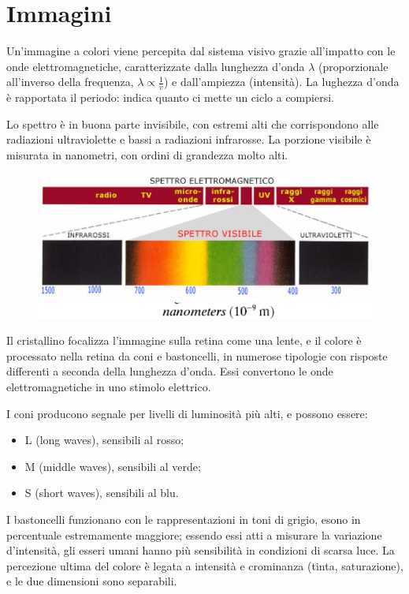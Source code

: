 \section{Immagini}
Un'immagine a colori viene percepita dal sistema visivo grazie all'impatto con le onde elettromagnetiche, caratterizzate dalla lunghezza d'onda $\lambda$ (proporzionale all'inverso della frequenza, $\lambda \propto \frac{1}{v}$) e dall'ampiezza (intensità). La lughezza d'onda è rapportata il periodo: indica quanto ci mette un ciclo a compiersi.

Lo spettro è in buona parte invisibile, con estremi alti che corrispondono alle radiazioni ultraviolette e bassi a radiazioni infrarosse. La porzione visibile è misurata in nanometri, con ordini di grandezza molto alti.

\begin{figure}[h]
	\centering
	\includegraphics[scale=0.6]{Lezioni/Immagini/arcobaleno}
\end{figure}

Il cristallino focalizza l'immagine sulla retina come una lente, e il colore è processato nella retina da coni e bastoncelli, in numerose tipologie con risposte differenti a seconda della lunghezza d'onda. Essi convertono le onde elettromagnetiche in uno stimolo elettrico.

I coni producono segnale per livelli di luminosità più alti, e possono essere:
\begin{itemize}
	\item L (long waves), sensibili al rosso;
	\item M (middle waves), sensibili al verde;
	\item S (short waves), sensibili al blu.
\end{itemize}

I bastoncelli funzionano con le rappresentazioni in toni di grigio, esono in percentuale estremamente maggiore; essendo essi atti a misurare la variazione d'intensità, gli esseri umani hanno più sensibilità in condizioni di scarsa luce. La percezione ultima del colore è legata a intensità e crominanza (tinta, saturazione), e le due dimensioni sono separabili. 

